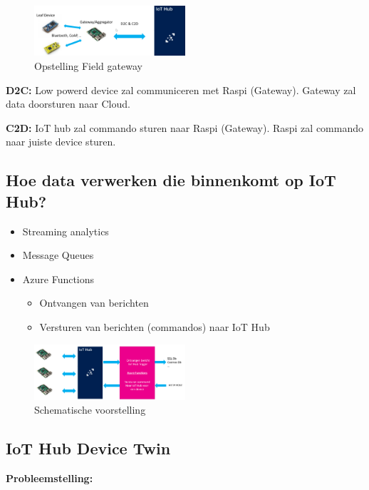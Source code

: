 \documentclass{article}
\newcommand{\bold}[1]{\textbf{#1}}
\begin{document}
\begin{figure}[H]
    \centering
    \includegraphics[width=0.5\textwidth]{iot-leaf.png}
    \caption{Opstelling Field gateway}
\end{figure}

\bold{D2C:} Low powerd device zal communiceren met Raspi (Gateway).
Gateway zal data doorsturen naar Cloud.

\bold{C2D:} IoT hub zal commando sturen naar Raspi (Gateway). 
Raspi zal commando naar juiste device sturen.

\subsection{Hoe data verwerken die binnenkomt op IoT Hub?}


\begin{itemize}
    \item Streaming analytics
    \item Message Queues
    \item Azure Functions
    \begin{itemize}
        \item Ontvangen van berichten
        \item Versturen van berichten (commandos) naar IoT Hub
    \end{itemize}
\end{itemize}

\begin{figure}[H]
    \centering
    \includegraphics[width=0.5\textwidth]{iot-hub-trigger.png}
    \caption{Schematische voorstelling}
\end{figure}


\subsection{IoT Hub Device Twin}

\bold{Probleemstelling:} 
\end{document}
